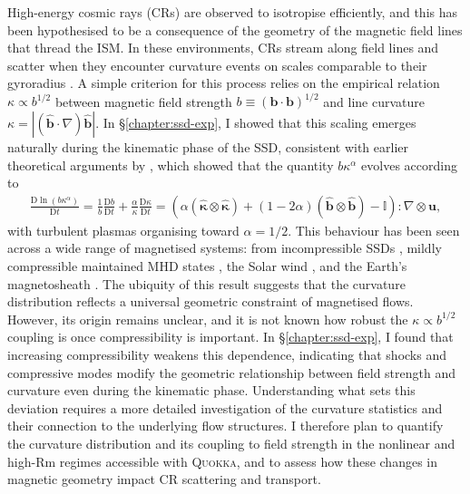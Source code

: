 \documentclass[12pt,twoside]{extreport}
\newcommand{\rbrac}[1]{\left( #1 \right)} %
\newcommand{\mUnit}[1]{\widehat{#1}}
\newcommand{\mVector}[1]{\bm{#1}} %
\newcommand{\mVectorUnit}[1]{\mUnit{\mVector{#1}}} %
\newcommand{\mTensor}[1]{\mathbb{#1}} %
\newcommand{\mDD}[1]{\mathrm{D} #1}
\newcommand{\mDDFrac}[2]{\frac{\mDD{#1}}{\mDD{#2}}}
\begin{document}
High-energy cosmic rays (CRs) are observed to isotropise efficiently, and this has been hypothesised to be a consequence of the geometry of the magnetic field lines that thread the ISM. In these environments, CRs stream along field lines and scatter when they encounter curvature events on scales comparable to their gyroradius \citep{kempski2023cosmic, Lemoine2023_field_reversal_CR_transport}. A simple criterion for this process relies on the empirical relation $\kappa \propto b^{1/2}$ between magnetic field strength $b \equiv (\mVector{b}\cdot\mVector{b})^{1/2}$ and line curvature $\kappa = |(\mVectorUnit{b}\cdot\nabla)\mVectorUnit{b}|$. In \S\ref{chapter:ssd-exp}, I showed that this scaling emerges naturally during the kinematic phase of the SSD, consistent with earlier theoretical arguments by \citet{schekochihin2004simulations}, which showed that the quantity $b \kappa^{\alpha}$ evolves according to
\begin{align}
    \mDDFrac{\ln(b \kappa^\alpha)}{t}
        = \frac{1}{b}\mDDFrac{b}{t} + \frac{\alpha}{\kappa}\mDDFrac{\kappa}{t}
        = \rbrac{
                \alpha (\mVectorUnit{\kappa}\otimes\mVectorUnit{\kappa})
                + (1 - 2\alpha) (\mVectorUnit{b}\otimes\mVectorUnit{b})
                - \mTensor{I}
            }:\nabla\otimes\mVector{u},
\end{align}
with turbulent plasmas organising toward $\alpha = 1/2$. This behaviour has been seen across a wide range of magnetised systems: from incompressible SSDs \citep{schekochihin2004simulations}, mildly compressible maintained MHD states \citep{yuen2020curvature}, the Solar wind \citep{huang2020observations, bandyopadhyay2020situ, hu2025interplanetary}, and the Earth's magnetosheath \citep{ji2022curvature}. The ubiquity of this result suggests that the curvature distribution reflects a universal geometric constraint of magnetised flows. However, its origin remains unclear, and it is not known how robust the $\kappa \propto b^{1/2}$ coupling is once compressibility is important. In \S\ref{chapter:ssd-exp}, I found that increasing compressibility weakens this dependence, indicating that shocks and compressive modes modify the geometric relationship between field strength and curvature even during the kinematic phase. Understanding what sets this deviation requires a more detailed investigation of the curvature statistics and their connection to the underlying flow structures. I therefore plan to quantify the curvature distribution and its coupling to field strength in the nonlinear and high-$\mathrm{Rm}$ regimes accessible with \textsc{Quokka}, and to assess how these changes in magnetic geometry impact CR scattering and transport.
\end{document}
